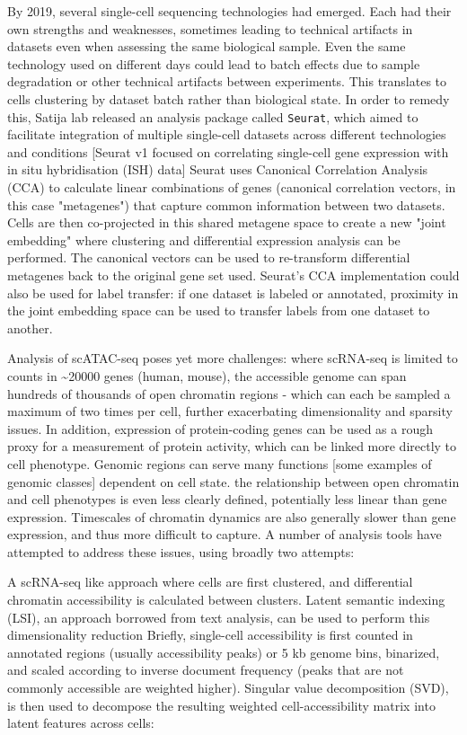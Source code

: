 By 2019, several single-cell sequencing technologies had emerged. Each had their own strengths and weaknesses, sometimes leading to technical artifacts in datasets even when assessing the same biological sample. Even the same technology used on different days could lead to batch effects due to sample degradation or other technical artifacts between experiments. This translates to cells clustering by dataset batch rather than biological state. In order to remedy this, Satija lab released an analysis package called \verb|Seurat|, which aimed to facilitate integration of multiple single-cell datasets across different technologies and conditions [Seurat v1 focused on correlating single-cell gene expression with in situ hybridisation (ISH) data] Seurat uses Canonical Correlation Analysis (CCA) to calculate linear combinations of genes (canonical correlation vectors, in this case "metagenes") that capture common information between two datasets. Cells are then co-projected in this shared metagene space to create a new "joint embedding" where clustering and differential expression analysis can be performed. The canonical vectors can be used to re-transform differential metagenes back to the original gene set used. Seurat's CCA implementation could also be used for label transfer: if one dataset is labeled or annotated, proximity in the joint embedding space can be used to transfer labels from one dataset to another.

Analysis of scATAC-seq poses yet more challenges: where scRNA-seq is limited to counts in \textasciitilde{\num{20000}} genes (human, mouse), the accessible genome can span hundreds of thousands of open chromatin regions - which can each be sampled a maximum of two times per cell, further exacerbating dimensionality and sparsity issues. In addition, expression of protein-coding genes can be used as a rough proxy for a measurement of protein activity, which can be linked more directly to cell phenotype. Genomic regions can serve many functions [some examples of genomic classes] dependent on cell state. the relationship between open chromatin and cell phenotypes is even less clearly defined, potentially less linear than gene expression. Timescales of chromatin dynamics are also generally slower than gene expression, and thus more difficult to capture. A number of analysis tools have attempted to address these issues, using broadly two attempts:

A scRNA-seq like approach where cells are first clustered, and differential chromatin accessibility is calculated between clusters. Latent semantic indexing (LSI), an approach borrowed from text analysis, can be used to perform this dimensionality reduction Briefly, single-cell accessibility is first counted in annotated regions (usually accessibility peaks) or 5 kb genome bins, binarized, and scaled according to inverse document frequency (peaks that are not commonly accessible are weighted higher). Singular value decomposition (SVD), is then used to decompose the resulting weighted cell-accessibility matrix into latent features across cells:

